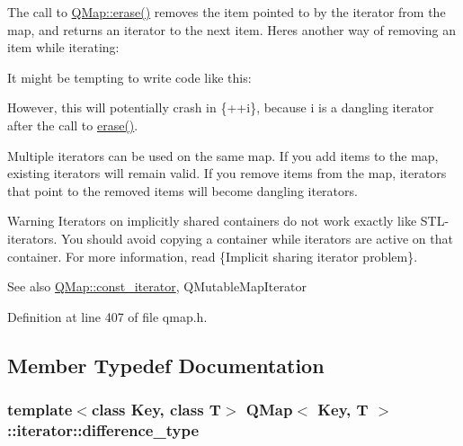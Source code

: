 \begin{DoxyCodeInclude}
\end{DoxyCodeInclude}
 The call to \hyperlink{class_q_map_add6cad4f0b12644cfe593d95f7a75807}{Q\+Map\+::erase()} removes the item pointed to by the iterator from the map, and returns an iterator to the next item. Here\textquotesingle{}s another way of removing an item while iterating\+:


\begin{DoxyCodeInclude}
\end{DoxyCodeInclude}
 It might be tempting to write code like this\+:


\begin{DoxyCodeInclude}
\end{DoxyCodeInclude}
 However, this will potentially crash in {\ttfamily }\{++i\}, because {\ttfamily i} is a dangling iterator after the call to \hyperlink{class_q_map_add6cad4f0b12644cfe593d95f7a75807}{erase()}.

Multiple iterators can be used on the same map. If you add items to the map, existing iterators will remain valid. If you remove items from the map, iterators that point to the removed items will become dangling iterators.

\begin{DoxyWarning}{Warning}
Iterators on implicitly shared containers do not work exactly like S\+T\+L-\/iterators. You should avoid copying a container while iterators are active on that container. For more information, read \{Implicit sharing iterator problem\}.
\end{DoxyWarning}
\begin{DoxySeeAlso}{See also}
\hyperlink{class_q_map_1_1const__iterator}{Q\+Map\+::const\+\_\+iterator}, Q\+Mutable\+Map\+Iterator 
\end{DoxySeeAlso}


Definition at line 407 of file qmap.\+h.



\subsection{Member Typedef Documentation}
\subsubsection[{\texorpdfstring{difference\+\_\+type}{difference_type}}]{\setlength{\rightskip}{0pt plus 5cm}template$<$class Key, class T$>$ {\bf Q\+Map}$<$ Key, T $>$\+::{\bf iterator\+::difference\+\_\+type}}\hypertarget{class_q_map_1_1iterator_afe73281b3461d1635bfdfa5b2e8e7f28}{}\label{class_q_map_1_1iterator_afe73281b3461d1635bfdfa5b2e8e7f28}


